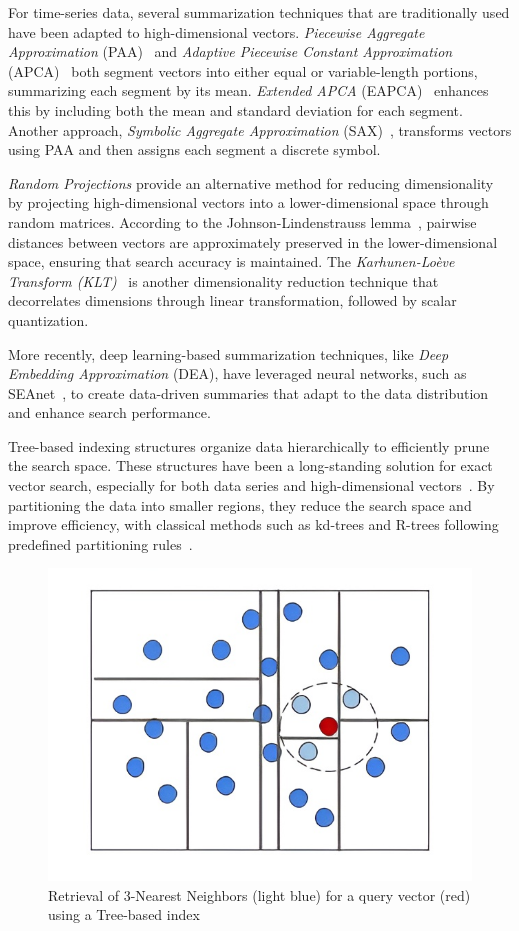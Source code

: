 For time-series data, several summarization techniques that are traditionally used have been adapted to high-dimensional vectors. \textit{Piecewise Aggregate Approximation} (PAA)~\cite{journal/kais/Keogh2001} and \textit{Adaptive Piecewise Constant Approximation} (APCA)~\cite{journal/acds/Chakrabarti2002} both segment vectors into either equal or variable-length portions, summarizing each segment by its mean. \textit{Extended APCA} (EAPCA)~\cite{conf/vldb/Wang2013} enhances this by including both the mean and standard deviation for each segment. Another approach, \textit{Symbolic Aggregate Approximation} (SAX)~\cite{conf/dmkd/LinKLC03}, transforms vectors using PAA and then assigns each segment a discrete symbol.

\textit{Random Projections} provide an alternative method for reducing dimensionality by projecting high-dimensional vectors into a lower-dimensional space through random matrices. According to the Johnson-Lindenstrauss lemma~\cite{conf/map/johnson84}, pairwise distances between vectors are approximately preserved in the lower-dimensional space, ensuring that search accuracy is maintained. The \textit{Karhunen-Lo\`{e}ve Transform (KLT)}~\cite{karhunen1947ueber,loeve1948functions} is another dimensionality reduction technique that decorrelates dimensions through linear transformation, followed by scalar quantization.

More recently, deep learning-based summarization techniques, like \textit{Deep Embedding Approximation} (DEA), have leveraged neural networks, such as SEAnet~\cite{seanetjournal}, to create data-driven summaries that adapt to the data distribution and enhance search performance.

 Tree-based indexing structures organize data hierarchically to efficiently prune the search space. These structures have been a long-standing solution for exact vector search, especially for both data series and high-dimensional vectors~\cite{conf/sigmod/Guttman1984,conf/icmd/Beckmann1990,journal/edbt/Schafer2012,dstree,ulissejournal}. By partitioning the data into smaller regions, they reduce the search space and improve efficiency, with classical methods such as kd-trees and R-trees following predefined partitioning rules~\cite{flann,hdindex}.

\begin{figure}[ht] 
\centering
		\captionsetup{justification=centering}
		\includegraphics[width=0.5\columnwidth]{../img/related/treeb.jpg}
		\caption{Retrieval of 3-Nearest Neighbors (light blue) for a query vector (red) using a Tree-based index}        
		\label{fig:tree_retrieval}
\end{figure}

